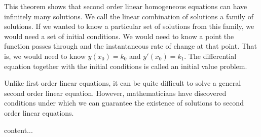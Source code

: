 \documentclass{ximera}
\begin{document}
	This theorem shows that second order linear homogeneous equations can have infinitely many solutions.  We call the linear combination of solutions a family of solutions.  If we wanted to know a particular set of solutions from this family, we would need a set of initial conditions.  We would need to know a point the function passes through and the instantaneous rate of change at that point.  That is, we would need to know $ y(x_0) = k_0 $ and $ y'(x_0) = k_1. $  The differential equation together with the initial conditions is called an initial value problem.
	
	Unlike first order linear equations, it can be quite difficult to solve a general second order linear equation.  However, mathematicians have discovered conditions under which we can guarantee the existence of solutions to second order linear equations.
	\begin{theorem}
		content...
	\end{theorem}
\end{document}
